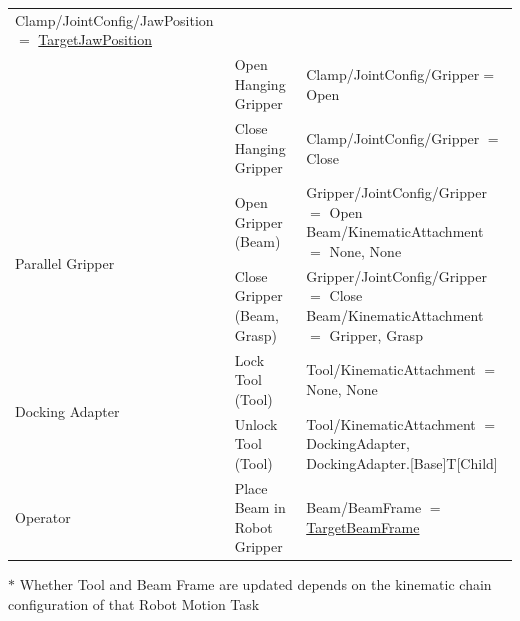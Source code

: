 \documentclass[11pt]{book}
\begin{document}
\begin{table}[H]
\begin{adjustbox}{max width=\textwidth}
\begin{tabular}{p{2.38cm}p{5.42cm}p{8.21cm}}
\multicolumn{1}{|p{8.21cm}|}{{\footnotesize Clamp/JointConfig/JawPosition $=$ \uline{TargetJawPosition}}} \\ 
\hhline{~--}
\multicolumn{1}{|p{2.38cm}}{} & 
\multicolumn{1}{|p{5.42cm}}{{\footnotesize Open Hanging Gripper}} & 
\multicolumn{1}{|p{8.21cm}|}{{\footnotesize Clamp/JointConfig/Gripper$=$ Open}} \\ 
\hhline{~--}
\multicolumn{1}{|p{2.38cm}}{} & 
\multicolumn{1}{|p{5.42cm}}{{\footnotesize Close Hanging Gripper}} & 
\multicolumn{1}{|p{8.21cm}|}{{\footnotesize Clamp/JointConfig/Gripper $=$ Close}} \\ 
\hline
\multicolumn{1}{|p{2.38cm}}{\multirow{2}{*}{\parbox{2.38cm}{{\footnotesize Parallel Gripper}}}} & 
\multicolumn{1}{|p{5.42cm}}{{\footnotesize Open Gripper (Beam)}} & 
\multicolumn{1}{|p{8.21cm}|}{{\footnotesize Gripper/JointConfig/Gripper $=$ Open} \newline
{\footnotesize Beam/KinematicAttachment $=$ None, None}} \\ 
\hhline{~--}
\multicolumn{1}{|p{2.38cm}}{} & 
\multicolumn{1}{|p{5.42cm}}{{\footnotesize Close Gripper (Beam, Grasp)}} & 
\multicolumn{1}{|p{8.21cm}|}{{\footnotesize Gripper/JointConfig/Gripper $=$ Close} \newline
{\footnotesize Beam/KinematicAttachment $=$ Gripper, Grasp}} \\ 
\hline
\multicolumn{1}{|p{2.38cm}}{\multirow{2}{*}{\parbox{2.38cm}{{\footnotesize Docking Adapter}}}} & 
\multicolumn{1}{|p{5.42cm}}{{\footnotesize Lock Tool (Tool)}} & 
\multicolumn{1}{|p{8.21cm}|}{{\footnotesize Tool/KinematicAttachment $=$ None, None}} \\ 
\hhline{~--}
\multicolumn{1}{|p{2.38cm}}{} & 
\multicolumn{1}{|p{5.42cm}}{{\footnotesize Unlock Tool (Tool)}} & 
\multicolumn{1}{|p{8.21cm}|}{{\footnotesize Tool/KinematicAttachment $=$ DockingAdapter, DockingAdapter.[Base]T[Child]}} \\ 
\hline
\multicolumn{1}{|p{2.38cm}}{{\footnotesize Operator}} & 
\multicolumn{1}{|p{5.42cm}}{{\footnotesize Place Beam in Robot Gripper}} & 
\multicolumn{1}{|p{8.21cm}|}{{\footnotesize Beam/BeamFrame $=$ \uline{TargetBeamFrame}}} \\ 
\hline
\end{tabular}
\end{adjustbox}
\end{table}
\vspace{4\baselineskip}
{\footnotesize $\ast$ Whether Tool and Beam Frame are updated depends on the kinematic chain configuration of that Robot Motion Task\par}
\end{document}
